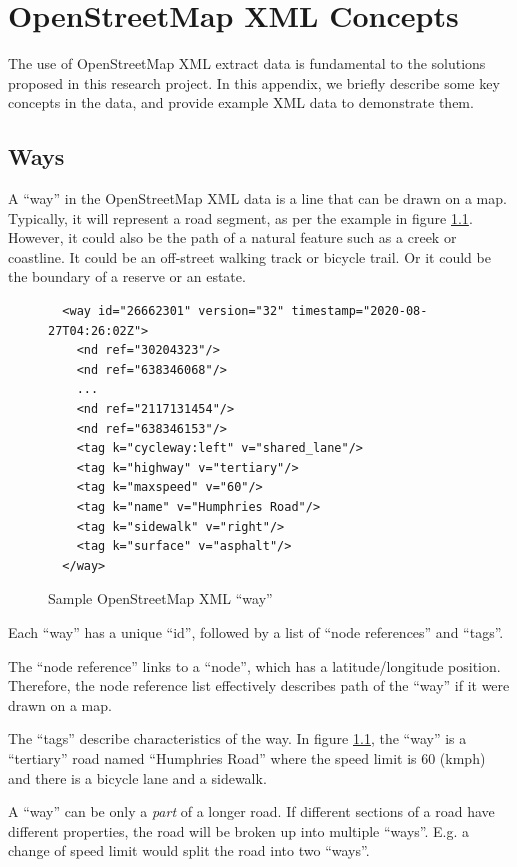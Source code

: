 \documentclass[11pt,twoside]{report}
\begin{document}
\chapter{OpenStreetMap XML Concepts}
\label{a:osm_concepts}

The use of OpenStreetMap XML extract data is fundamental to the solutions proposed in this research project.  In this appendix, we briefly describe some key concepts in the data, and provide example XML data to demonstrate them.

\section{Ways}
\label{osm:ways}

A ``way'' in the OpenStreetMap XML data is a line that can be drawn on a map.  Typically, it will represent a road segment, as per the example in figure \ref{xml:way_st}.  However, it could also be the path of a natural feature such as a creek or coastline.  It could be an off-street walking track or bicycle trail.  Or it could be the boundary of a reserve or an estate.

\begin{figure}[t]
\centering
\begin{verbatim}
  <way id="26662301" version="32" timestamp="2020-08-27T04:26:02Z">
    <nd ref="30204323"/>
    <nd ref="638346068"/>
    ...
    <nd ref="2117131454"/>
    <nd ref="638346153"/>
    <tag k="cycleway:left" v="shared_lane"/>
    <tag k="highway" v="tertiary"/>
    <tag k="maxspeed" v="60"/>
    <tag k="name" v="Humphries Road"/>
    <tag k="sidewalk" v="right"/>
    <tag k="surface" v="asphalt"/>
  </way>
\end{verbatim}
\caption{Sample OpenStreetMap XML ``way''}
\label{xml:way_st}
\end{figure}

Each ``way'' has a unique ``id'', followed by a list of ``node references'' and ``tags''.

The ``node reference'' links to a ``node'', which has a latitude/longitude position.  Therefore, the node reference list effectively describes path of the ``way'' if it were drawn on a map.

The ``tags'' describe characteristics of the way.  In figure \ref{xml:way_st}, the ``way'' is a ``tertiary'' road named ``Humphries Road'' where the speed limit is 60 (kmph) and there is a bicycle lane and a sidewalk.

A ``way'' can be only a \textit{part} of a longer road.  If different sections of a road have different properties, the road will be broken up into multiple ``ways''.  E.g. a change of speed limit would split the road into two ``ways''.
\end{document}
